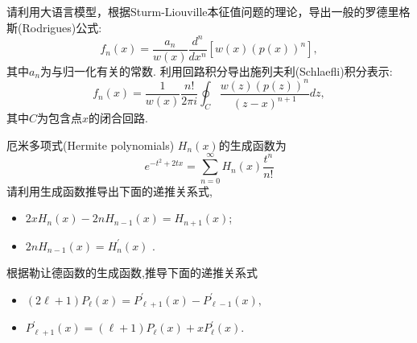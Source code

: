 \documentclass[11pt]{article}
\begin{document}
\begin{hwproblem}{}
 请利用大语言模型，根据Sturm-Liouville本征值问题的理论，导出一般的罗德里格斯(Rodrigues)公式:
 $$
 f_n(x)=\frac{a_n}{w(x)} \frac{d^n}{d x^n}\left[w(x)(p(x))^n\right] ,
 $$
 其中$a_n$为与归一化有关的常数. 利用回路积分导出施列夫利(Schlaefli)积分表示:
 $$
 f_n(x)=\frac{1}{w(x)} \frac{n!}{2 \pi i} \oint_C \frac{w(z)(p(z))^n}{(z-x)^{n+1}} d z ,
 $$
 其中$C$为包含点$x$的闭合回路.
\end{hwproblem}


\begin{hwproblem}{}
  厄米多项式(Hermite polynomials) $H_n(x)$的生成函数为
  $$
  e^{-t^2+2 t x}=\sum_{n=0}^{\infty} H_n(x) \frac{t^n}{n !}
  $$
  请利用生成函数推导出下面的递推关系式,
  \begin{itemize}
    \item[(1)] $2 x H_n(x)-2 n H_{n-1}(x)=H_{n+1}(x)$;
    \item[(2)] $2 n H_{n-1}(x)=H_n^{\prime}(x)$ . 
  \end{itemize}
\end{hwproblem}

\vspace{0.5cm}


\begin{hwproblem}{}
根据勒让德函数的生成函数,推导下面的递推关系式
\begin{itemize}
  \item[(1)] $
  (2 \ell+1) P_\ell(x)=P_{\ell+1}^{\prime}(x)-P_{\ell-1}^{\prime}(x),
  $
  \item[(2)]
  $
  P_{\ell+1}^{\prime}(x)=(\ell+1) P_\ell(x)+x P_\ell^{\prime}(x).
  $
\end{itemize}

\end{hwproblem}

\vspace{0.5cm}
  

\end{document}
